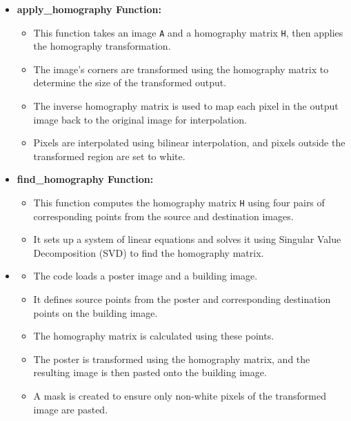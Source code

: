 \documentclass{article}
\begin{document}
\begin{itemize}
    
    \item \textbf{apply\_homography Function:} 
    \begin{itemize}
        \item This function takes an image \texttt{A} and a homography matrix \texttt{H}, then applies the homography transformation.
        \item The image's corners are transformed using the homography matrix to determine the size of the transformed output.
        \item The inverse homography matrix is used to map each pixel in the output image back to the original image for interpolation.
        \item Pixels are interpolated using bilinear interpolation, and pixels outside the transformed region are set to white.
    \end{itemize}
    
    \item \textbf{find\_homography Function:} 
    \begin{itemize}
        \item This function computes the homography matrix \texttt{H} using four pairs of corresponding points from the source and destination images.
        \item It sets up a system of linear equations and solves it using Singular Value Decomposition (SVD) to find the homography matrix.
    \end{itemize}
    
    \item 
    \begin{itemize}
        \item The code loads a poster image and a building image.
        \item It defines source points from the poster and corresponding destination points on the building image.
        \item The homography matrix is calculated using these points.
        \item The poster is transformed using the homography matrix, and the resulting image is then pasted onto the building image.
        \item A mask is created to ensure only non-white pixels of the transformed image are pasted.
    \end{itemize}
\end{itemize}
\end{document}

